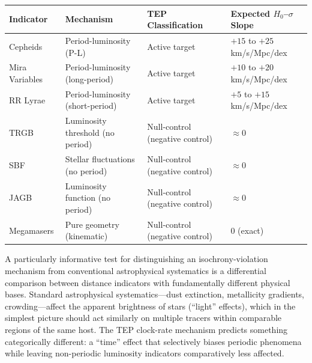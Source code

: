 \documentclass[
]{article}
\newcounter{none} %
\begin{document}
{\def\LTcaptype{none} %
\begin{longtable}[]{@{}
  >{\raggedright\arraybackslash}p{}
  >{\raggedright\arraybackslash}p{}
  >{\raggedright\arraybackslash}p{}
  >{\raggedright\arraybackslash}p{}@{}}
\toprule\noalign{}
\begin{minipage}[b]{\linewidth}\raggedright
Indicator
\end{minipage} & \begin{minipage}[b]{\linewidth}\raggedright
Mechanism
\end{minipage} & \begin{minipage}[b]{\linewidth}\raggedright
TEP Classification
\end{minipage} & \begin{minipage}[b]{\linewidth}\raggedright
Expected \(H_0\)--\(\sigma\) Slope
\end{minipage} \\
\midrule\noalign{}
\endhead
\bottomrule\noalign{}
\endlastfoot
Cepheids & Period-luminosity (P-L) & Active target & \(+15\) to \(+25\)
km/s/Mpc/dex \\
Mira Variables & Period-luminosity (long-period) & Active target &
\(+10\) to \(+20\) km/s/Mpc/dex \\
RR Lyrae & Period-luminosity (short-period) & Active target & \(+5\) to
\(+15\) km/s/Mpc/dex \\
TRGB & Luminosity threshold (no period) & Null-control (negative
control) & \(\approx 0\) \\
SBF & Stellar fluctuations (no period) & Null-control (negative control)
& \(\approx 0\) \\
JAGB & Luminosity function (no period) & Null-control (negative control)
& \(\approx 0\) \\
Megamasers & Pure geometry (kinematic) & Null-control (negative control)
& \(0\) (exact) \\
\end{longtable}
}

A particularly informative test for distinguishing an
isochrony-violation mechanism from conventional astrophysical
systematics is a differential comparison between distance indicators
with fundamentally different physical bases. Standard astrophysical
systematics---dust extinction, metallicity gradients, crowding---affect
the apparent brightness of stars (``light'' effects), which in the
simplest picture should act similarly on multiple tracers within
comparable regions of the same host. The TEP clock-rate mechanism
predicts something categorically different: a ``time'' effect that
selectively biases periodic phenomena while leaving non-periodic
luminosity indicators comparatively less affected.
\end{document}
